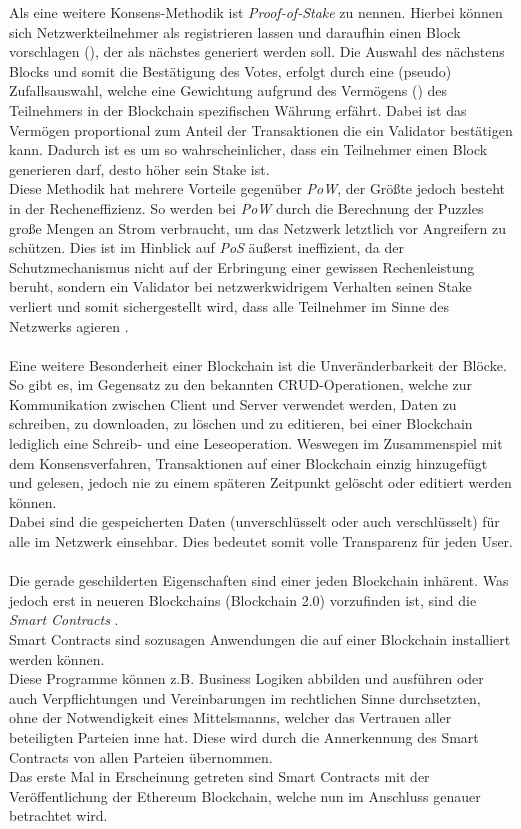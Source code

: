 Als eine weitere Konsens-Methodik ist \textit{Proof-of-Stake} zu nennen. Hierbei können sich Netzwerkteilnehmer als  registrieren lassen und daraufhin einen Block vorschlagen (), der als nächstes generiert werden soll. Die Auswahl des nächstens Blocks und somit die Bestätigung des Votes, erfolgt durch eine (pseudo) Zufallsauswahl, welche eine Gewichtung aufgrund des Vermögens () des Teilnehmers in der Blockchain spezifischen Währung erfährt. Dabei ist das Vermögen proportional zum Anteil der Transaktionen die ein Validator bestätigen kann. Dadurch ist es um so wahrscheinlicher, dass ein Teilnehmer einen Block generieren darf, desto höher sein Stake ist. \\
Diese Methodik hat mehrere Vorteile gegenüber \textit{PoW}, der Größte jedoch besteht in der Recheneffizienz. So werden bei \textit{PoW} durch die Berechnung der Puzzles große Mengen an Strom verbraucht, um das Netzwerk letztlich vor Angreifern zu schützen. Dies ist im Hinblick auf \textit{PoS} äußerst ineffizient, da der Schutzmechanismus nicht auf der Erbringung einer gewissen Rechenleistung beruht, sondern ein Validator bei netzwerkwidrigem Verhalten seinen Stake verliert und somit sichergestellt wird, dass alle Teilnehmer im Sinne des Netzwerks agieren \cite{PoS:BCMAG,PoS:EthWiki}. \\\\
Eine weitere Besonderheit einer Blockchain ist die Unveränderbarkeit der Blöcke. So gibt es, im Gegensatz zu den bekannten CRUD-Operationen, welche zur Kommunikation zwischen Client und Server verwendet werden, Daten zu schreiben, zu downloaden, zu löschen und zu editieren, bei einer Blockchain lediglich eine Schreib- und eine Leseoperation. Weswegen im Zusammenspiel mit dem Konsensverfahren, Transaktionen auf einer Blockchain einzig hinzugefügt und gelesen, jedoch nie zu einem späteren Zeitpunkt gelöscht oder editiert werden können. \\
Dabei sind die gespeicherten Daten (unverschlüsselt oder auch verschlüsselt) für alle im Netzwerk einsehbar. Dies bedeutet somit volle Transparenz für jeden User. \\\\ 
Die gerade geschilderten Eigenschaften sind einer jeden Blockchain inhärent. 
Was jedoch erst in neueren Blockchains (Blockchain 2.0) vorzufinden ist, sind die \textit{Smart Contracts} \cite{SC:EconomyOutlook, MasteringBlockchain}.\\
Smart Contracts sind sozusagen Anwendungen die auf einer Blockchain installiert werden können.\\
Diese Programme können z.B. Business Logiken abbilden und ausführen oder auch Verpflichtungen und Vereinbarungen im rechtlichen Sinne durchsetzten, ohne der Notwendigkeit eines Mittelsmanns, welcher das Vertrauen aller beteiligten Parteien inne hat. Diese  wird durch die Annerkennung des Smart Contracts von allen Parteien übernommen. \\
Das erste Mal in Erscheinung getreten sind Smart Contracts mit der Veröffentlichung der Ethereum Blockchain, welche nun im Anschluss genauer betrachtet wird.


